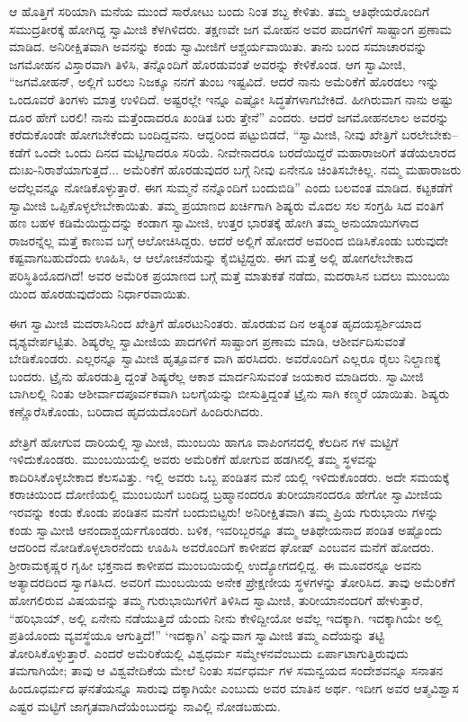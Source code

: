 ಆ ಹೊತ್ತಿಗೆ ಸರಿಯಾಗಿ ಮನೆಯ ಮುಂದೆ ಸಾರೋಟು ಬಂದು ನಿಂತ ಶಬ್ದ ಕೇಳಿತು. ತಮ್ಮ ಆತಿಥೇಯರೊಂದಿಗೆ ಸಮುದ್ರತೀರಕ್ಕೆ ಹೋಗಿದ್ದ ಸ್ವಾಮೀಜಿ ಕೆಳಗಿಳಿದರು. ತಕ್ಷಣವೇ ಜಗ ಮೋಹನ ಅವರ ಪಾದಗಳಿಗೆ ಸಾಷ್ಟಾಂಗ ಪ್ರಣಾಮ ಮಾಡಿದ. ಅನಿರೀಕ್ಷಿತವಾಗಿ ಅವನನ್ನು ಕಂಡು ಸ್ವಾಮೀಜಿಗೆ ಆಶ್ಚರ್ಯವಾಯಿತು. ತಾನು ಬಂದ ಸಮಾಚಾರವನ್ನು ಜಗಮೋಹನ ವಿಸ್ತಾರವಾಗಿ ತಿಳಿಸಿ, ತನ್ನೊಂದಿಗೆ ಹೊರಡುವಂತೆ ಅವರನ್ನು ಕೇಳಿಕೊಂಡ. ಆಗ ಸ್ವಾಮೀಜಿ, “ಜಗಮೋಹನ್, ಅಲ್ಲಿಗೆ ಬರಲು ನಿಜಕ್ಕೂ ನನಗೆ ತುಂಬ ಇಷ್ಟವಿದೆ. ಆದರೆ ನಾನು ಅಮೆರಿಕೆಗೆ ಹೊರಡಲು ಇನ್ನು ಒಂದೂವರೆ ತಿಂಗಳು ಮಾತ್ರ ಉಳಿದಿದೆ. ಅಷ್ಟರಲ್ಲೇ ಇನ್ನೂ ಎಷ್ಟೋ ಸಿದ್ಧತೆಗಳಾಗಬೇಕಿದೆ. ಹೀಗಿರುವಾಗ ನಾನು ಅಷ್ಟು ದೂರ ಹೇಗೆ ಬರಲಿ! ನಾನು ಮತ್ತೆಂದಾದರೂ ಖಂಡಿತ ಬರು ತ್ತೇನೆ” ಎಂದರು. ಆದರೆ ಜಗಮೋಹನಲಾಲ ಅವರನ್ನು ಕರೆದುಕೊಂಡೇ ಹೋಗಬೇಕೆಂದು ಬಂದಿದ್ದವನು. ಆದ್ದರಿಂದ ಪಟ್ಟುಬಿಡದೆ, “ಸ್ವಾಮೀಜಿ, ನೀವು ಖೇತ್ರಿಗೆ ಬರಲೇಬೇಕು–ಕಡೆಗೆ ಒಂದೇ ಒಂದು ದಿನದ ಮಟ್ಟಿಗಾದರೂ ಸರಿಯೆ. ನೀವೇನಾದರೂ ಬರದೆಯಿದ್ದರೆ ಮಹಾರಾಜರಿಗೆ ತಡೆಯಲಾರದ ದುಃಖ-ನಿರಾಶೆಯಾಗುತ್ತದೆ... ಅಮೆರಿಕೆಗೆ ಹೊರಡುವುದರ ಬಗ್ಗೆ ನೀವು ಏನೇನೂ ಚಿಂತಿಸಬೇಕಿಲ್ಲ. ನಮ್ಮ ಮಹಾರಾಜರು ಅದೆಲ್ಲವನ್ನೂ ನೋಡಿಕೊಳ್ಳುತ್ತಾರೆ. ಈಗ ಸುಮ್ಮನೆ ನನ್ನೊಂದಿಗೆ ಬಂದುಬಿಡಿ” ಎಂದು ಬಲವಂತ ಮಾಡಿದ. ಕಟ್ಟಕಡೆಗೆ ಸ್ವಾಮೀಜಿ ಒಪ್ಪಿಕೊಳ್ಳಲೇಬೇಕಾಯಿತು. ತಮ್ಮ ಪ್ರಯಾಣದ ಖರ್ಚಿಗಾಗಿ ಶಿಷ್ಯರು ಮೊದಲ ಸಲ ಸಂಗ್ರಹಿ ಸಿದ ವಂತಿಗೆ ಹಣ ಬಹಳ ಕಡಿಮೆಯಿದ್ದುದನ್ನು ಕಂಡಾಗ ಸ್ವಾಮೀಜಿ, ಉತ್ತರ ಭಾರತಕ್ಕೆ ಹೋಗಿ ತಮ್ಮ ಅನುಯಾಯಿಗಳಾದ ರಾಜರನ್ನೆಲ್ಲ ಮತ್ತೆ ಕಾಣುವ ಬಗ್ಗೆ ಆಲೋಚಿಸಿದ್ದರು. ಆದರೆ ಅಲ್ಲಿಗೆ ಹೋದರೆ ಅವರಿಂದ ಬಿಡಿಸಿಕೊಂಡು ಬರುವುದೇ ಕಷ್ಟವಾಗಬಹುದೆಂದು ಊಹಿಸಿ, ಆ ಆಲೋಚನೆಯನ್ನು ಕೈಬಿಟ್ಟಿದ್ದರು. ಈಗ ಮತ್ತೆ ಅಲ್ಲಿ ಹೋಗಲೇಬೇಕಾದ ಪರಿಸ್ಥಿತಿಯೊದಗಿದೆ! ಅವರ ಅಮೆರಿಕ ಪ್ರಯಾಣದ ಬಗ್ಗೆ ಮತ್ತೆ ಮಾತುಕತೆ ನಡೆದು, ಮದರಾಸಿನ ಬದಲು ಮುಂಬಯಿ ಯಿಂದ ಹೊರಡುವುದೆಂದು ನಿರ್ಧಾರವಾಯಿತು.

ಈಗ ಸ್ವಾಮೀಜಿ ಮದರಾಸಿನಿಂದ ಖೇತ್ರಿಗೆ ಹೊರಟುನಿಂತರು. ಹೊರಡುವ ದಿನ ಅತ್ಯಂತ ಹೃದಯಸ್ಪರ್ಶಿಯಾದ ದೃಶ್ಯವೇರ್ಪಟ್ಟಿತು. ಶಿಷ್ಯರೆಲ್ಲ ಸ್ವಾಮೀಜಿಯ ಪಾದಗಳಿಗೆ ಸಾಷ್ಟಾಂಗ ಪ್ರಣಾಮ ಮಾಡಿ, ಆಶೀರ್ವದಿಸುವಂತೆ ಬೇಡಿಕೊಂಡರು. ಎಲ್ಲರನ್ನೂ ಸ್ವಾಮೀಜಿ ಹೃತ್ಪೂರ್ವಕ ವಾಗಿ ಹರಸಿದರು. ಅವರೊಂದಿಗೆ ಎಲ್ಲರೂ ರೈಲು ನಿಲ್ದಾಣಕ್ಕೆ ಬಂದರು. ಟ್ರೈನು ಹೊರಡುತ್ತಿ ದ್ದಂತೆ ಶಿಷ್ಯರೆಲ್ಲ ಆಕಾಶ ಮಾರ್ದನಿಸುವಂತೆ ಜಯಕಾರ ಮಾಡಿದರು. ಸ್ವಾಮೀಜಿ ಬಾಗಿಲಲ್ಲಿ ನಿಂತು ಆಶೀರ್ವಾದಪೂರ್ವಕವಾಗಿ ಬಲಗೈಯನ್ನು ಬೀಸುತ್ತಿದ್ದಂತೆ ಟ್ರೈನು ಸಾಗಿ ಕಣ್ಮರೆ ಯಾಯಿತು. ಶಿಷ್ಯರು ಕಣ್ಣೊರೆಸಿಕೊಂಡು, ಬರಿದಾದ ಹೃದಯದೊಂದಿಗೆ ಹಿಂದಿರುಗಿದರು.

ಖೇತ್ರಿಗೆ ಹೋಗುವ ದಾರಿಯಲ್ಲಿ ಸ್ವಾಮೀಜಿ, ಮುಂಬಯಿ ಹಾಗೂ ವಾಪಿಂಗನದಲ್ಲಿ ಕೆಲದಿನ ಗಳ ಮಟ್ಟಿಗೆ ಇಳಿದುಕೊಂಡರು. ಮುಂಬಯಿಯಲ್ಲಿ ಅವರು ಅಮೆರಿಕೆಗೆ ಹೋಗುವ ಹಡಗಿನಲ್ಲಿ ತಮ್ಮ ಸ್ಥಳವನ್ನು ಕಾದಿರಿಸಿಕೊಳ್ಳಬೇಕಾದ ಕೆಲಸವಿತ್ತು. ಇಲ್ಲಿ ಅವರು ಒಬ್ಬ ಪಂಡಿತನ ಮನೆ ಯಲ್ಲಿ ಇಳಿದುಕೊಂಡರು. ಅದೇ ಸಮಯಕ್ಕೆ ಕರಾಚಿಯಿಂದ ದೋಣಿಯಲ್ಲಿ ಮುಂಬಯಿಗೆ ಬಂದಿದ್ದ ಬ್ರಹ್ಮಾನಂದರೂ ತುರೀಯಾನಂದರೂ ಹೇಗೋ ಸ್ವಾಮೀಜಿಯ ಇರವನ್ನು ಕಂಡು ಕೊಂಡು ಪಂಡಿತನ ಮನೆಗೆ ಬಂದುಬಿಟ್ಟರು! ಅನಿರೀಕ್ಷಿತವಾಗಿ ತಮ್ಮ ಪ್ರಿಯ ಗುರುಭಾಯಿ ಗಳನ್ನು ಕಂಡು ಸ್ವಾಮೀಜಿ ಆನಂದಾಶ್ಚರ್ಯಗೊಂಡರು. ಬಳಿಕ, ಇವರಿಬ್ಬರನ್ನೂ ತಮ್ಮ ಆತಿಥೇಯನಾದ ಪಂಡಿತ ಅಷ್ಟೊಂದು ಆದರಿಂದ ನೋಡಿಕೊಳ್ಳಲಾರನೆಂದು ಊಹಿಸಿ ಅವರೊಂದಿಗೆ ಕಾಳೀಪದ ಘೋಷ್ ಎಂಬವನ ಮನೆಗೆ ಹೋದರು. ಶ್ರೀರಾಮಕೃಷ್ಣರ ಗೃಹೀ ಭಕ್ತನಾದ ಕಾಳೀಪದ ಮುಂಬಯಿಯಲ್ಲಿ ಉದ್ಯೋಗದಲ್ಲಿದ್ದ. ಈ ಮೂವರನ್ನೂ ಅವನು ಅತ್ಯಾದರದಿಂದ ಸ್ವಾಗತಿಸಿದ. ಅವರಿಗೆ ಮುಂಬಯಿಯ ಅನೇಕ ಪ್ರೇಕ್ಷಣೀಯ ಸ್ಥಳಗಳನ್ನು ತೋರಿಸಿದ. ತಾವು ಅಮೆರಿಕೆಗೆ ಹೋಗಲಿರುವ ವಿಷಯವನ್ನು ತಮ್ಮ ಗುರುಭಾಯಿಗಳಿಗೆ ತಿಳಿಸಿದ ಸ್ವಾಮೀಜಿ, ತುರೀಯಾನಂದರಿಗೆ ಹೇಳುತ್ತಾರೆ, “ಹರಿಭಾಯ್, ಅಲ್ಲಿ ಏನೇನು ನಡೆಯುತ್ತಿದೆ ಯೆಂದು ನೀನು ಕೇಳಿದ್ದೀಯೋ ಅವೆಲ್ಲ ಇದಕ್ಕಾಗಿ. ಇದಕ್ಕಾಗಿಯೇ ಅಲ್ಲಿ ಪ್ರತಿಯೊಂದು ವ್ಯವಸ್ಥೆಯೂ ಆಗುತ್ತಿದೆ!” ‘ಇದಕ್ಕಾಗಿ’ ಎನ್ನುವಾಗ ಸ್ವಾಮೀಜಿ ತಮ್ಮ ಎದೆಯನ್ನು ತಟ್ಟಿ ತೋರಿಸಿಕೊಳ್ಳುತ್ತಾರೆ. ಎಂದರೆ ಅಮೆರಿಕೆಯಲ್ಲಿ ವಿಶ್ವಧರ್ಮ ಸಮ್ಮೇಳನವೆಂಬುದು ಏರ್ಪಾಟಾಗುತ್ತಿರುವುದು ತಮಗಾಗಿಯೇ; ತಾವು ಆ ವಿಶ್ವವೇದಿಕೆಯ ಮೇಲೆ ನಿಂತು ಸರ್ವಧರ್ಮ ಗಳ ಸಮನ್ವಯದ ಸಂದೇಶವನ್ನೂ ಸನಾತನ ಹಿಂದೂಧರ್ಮದ ಘನತೆಯನ್ನೂ ಸಾರುವು ದಕ್ಕಾಗಿಯೇ ಎಂಬುದು ಅವರ ಮಾತಿನ ಅರ್ಥ. ಇದೀಗ ಅವರ ಆತ್ಮವಿಶ್ವಾಸ ಎಷ್ಟರ ಮಟ್ಟಿಗೆ ಜಾಗೃತವಾಗಿದೆಯೆಂಬುದನ್ನು ನಾವಿಲ್ಲಿ ನೋಡಬಹುದು.


